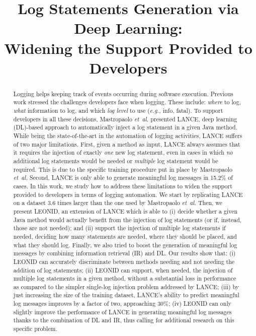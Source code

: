 \documentclass[10pt,conference]{IEEEtran}
\newcommand{\eg}{\emph{e.g.,}\xspace}
\newcommand{\etal}{\emph{et~al.}\xspace}
\newcommand{\approach}{LEONID\xspace} %
\begin{document}
\title{Log Statements Generation via Deep Learning:\\Widening the Support Provided to Developers\vspace{-1cm}}


\maketitle

\begin{abstract}
Logging helps keeping track of events occurring during software execution. Previous work stressed the challenges developers face when logging. These include: \emph{where} to log, \emph{what} information to log, and which \emph{log level} to use (\eg info, fatal). To support developers in all these decisions, Mastropaolo \etal presented LANCE, deep learning (DL)-based approach to automatically inject a log statement in a given Java method. While being the state-of-the-art in the automation of logging activities, LANCE suffers of two major limitations. First, given a method as input, LANCE always assumes that it requires the injection of exactly \emph{one} new log statement, even in cases in which \emph{no} additional log statements would be needed or \emph{multiple} log statement would be required. This is due to the specific training procedure put in place by Mastropaolo \etal Second, LANCE is only able to generate meaningful log messages in 15.2\% of cases. In this work, we study how to address these limitations to widen the support provided to developers in terms of logging automation. We start by replicating LANCE on a dataset 3.6 times larger than the one used by Mastropaolo \etal Then, we present \approach, an extension of LANCE which is able to (i) decide whether a given Java method would actually benefit from the injection of log statements (or if, instead, those are not needed); and (ii) support the injection of multiple log statements if needed, deciding how many statements are needed, where they should be placed, and what they should log. Finally, we also tried to boost the generation of meaningful log messages by combining information retrieval (IR) and DL. Our results show that: (i) \approach can accurately discriminate between methods needing and not needing the addition of log statements; (ii) \approach can support, when needed, the injection of multiple log statements in a given method, without a substantial loss in performance as compared to the simpler single-log injection problem addressed by LANCE; (iii) by just increasing the size of the training dataset, LANCE's ability to predict meaningful log messages improves by a factor of two, approaching 30\%; (iv) \approach can only slightly improve the performance of LANCE in generating meaningful log messages thanks to the combination of DL and IR, thus calling for additional research on this specific problem.
\end{abstract}
\end{document}
